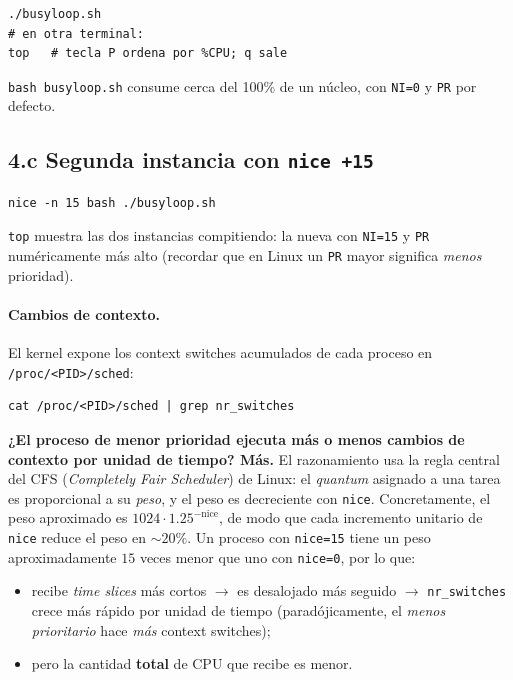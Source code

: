\documentclass[11pt,a4paper]{article}
\begin{document}
\begin{lstlisting}
./busyloop.sh
# en otra terminal:
top   # tecla P ordena por %CPU; q sale
\end{lstlisting}

\texttt{bash busyloop.sh} consume cerca del 100\% de un núcleo, con
\texttt{NI=0} y \texttt{PR} por defecto.

\subsection*{4.c Segunda instancia con \texttt{nice +15}}

\begin{lstlisting}
nice -n 15 bash ./busyloop.sh
\end{lstlisting}

\texttt{top} muestra las dos instancias compitiendo: la nueva con
\texttt{NI=15} y \texttt{PR} numéricamente más alto (recordar que en
Linux un \texttt{PR} mayor significa \emph{menos} prioridad).

\paragraph{Cambios de contexto.} El kernel expone los context switches
acumulados de cada proceso en \texttt{/proc/<PID>/sched}:

\begin{lstlisting}
cat /proc/<PID>/sched | grep nr_switches
\end{lstlisting}

\textbf{¿El proceso de menor prioridad ejecuta más o menos cambios de
contexto por unidad de tiempo? Más.} El razonamiento usa la regla
central del CFS (\emph{Completely Fair Scheduler}) de Linux: el
\emph{quantum} asignado a una tarea es proporcional a su \emph{peso},
y el peso es decreciente con \texttt{nice}. Concretamente, el peso
aproximado es $1024 \cdot 1{.}25^{-\text{nice}}$, de modo que cada
incremento unitario de \texttt{nice} reduce el peso en $\sim 20\%$.
Un proceso con \texttt{nice=15} tiene un peso aproximadamente
$15$ veces menor que uno con \texttt{nice=0}, por lo que:

\begin{itemize}[leftmargin=*]
    \item recibe \emph{time slices} más cortos $\rightarrow$ es desalojado
        más seguido $\rightarrow$ \texttt{nr\_switches} crece más rápido
        por unidad de tiempo (paradójicamente, el \emph{menos prioritario}
        hace \emph{más} context switches);
    \item pero la cantidad \textbf{total} de CPU que recibe es menor.
\end{itemize}
\end{document}
